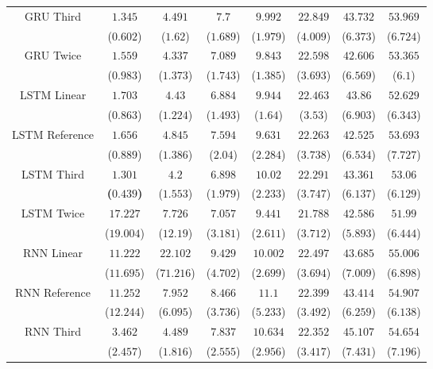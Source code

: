\begin{table}[!ht]
{\begin{tabular}{|c|c|c|c|c|c|c|c|}
			\multirow{2}{*}{GRU Third} & $1.345$ & $4.491$ & $7.7$ & $9.992$ & $22.849$ & $43.732$ & $53.969$ \\
			 & ($0.602$) & ($1.62$) & ($1.689$) & ($1.979$) & ($4.009$) & ($6.373$) & ($6.724$) \\ \hline
			\multirow{2}{*}{GRU Twice} & $1.559$ & $4.337$ & $7.089$ & $9.843$ & $22.598$ & $42.606$ & $53.365$ \\
			 & ($0.983$) & ($1.373$) & ($1.743$) & ($1.385$) & ($3.693$) & ($6.569$) & ($6.1$) \\ \hline
			\multirow{2}{*}{LSTM Linear} & $1.703$ & $4.43$ & $6.884$ & $9.944$ & $22.463$ & $43.86$ & $52.629$ \\
			 & ($0.863$) & ($1.224$) & ($1.493$) & ($1.64$) & ($3.53$) & ($6.903$) & ($6.343$) \\ \hline
			\multirow{2}{*}{LSTM Reference} & $1.656$ & $4.845$ & $7.594$ & $9.631$ & $22.263$ & $42.525$ & $53.693$ \\
			 & ($0.889$) & ($1.386$) & ($2.04$) & ($2.284$) & ($3.738$) & ($6.534$) & ($7.727$) \\ \hline
			\multirow{2}{*}{LSTM Third} & $\mathbf{1.301}$ & $4.2$ & $6.898$ & $10.02$ & $22.291$ & $43.361$ & $53.06$ \\
			 & \textbf{(}$\mathbf{0.439}$\textbf{)} & ($1.553$) & ($1.979$) & ($2.233$) & ($3.747$) & ($6.137$) & ($6.129$) \\ \hline
			\multirow{2}{*}{LSTM Twice} & $17.227$ & $7.726$ & $7.057$ & $9.441$ & $21.788$ & $42.586$ & $51.99$ \\
			 & ($19.004$) & ($12.19$) & ($3.181$) & ($2.611$) & ($3.712$) & ($5.893$) & ($6.444$) \\ \hline
			\multirow{2}{*}{RNN Linear} & $11.222$ & $22.102$ & $9.429$ & $10.002$ & $22.497$ & $43.685$ & $55.006$ \\
			 & ($11.695$) & ($71.216$) & ($4.702$) & ($2.699$) & ($3.694$) & ($7.009$) & ($6.898$) \\ \hline
			\multirow{2}{*}{RNN Reference} & $11.252$ & $7.952$ & $8.466$ & $11.1$ & $22.399$ & $43.414$ & $54.907$ \\
			 & ($12.244$) & ($6.095$) & ($3.736$) & ($5.233$) & ($3.492$) & ($6.259$) & ($6.138$) \\ \hline
			\multirow{2}{*}{RNN Third} & $3.462$ & $4.489$ & $7.837$ & $10.634$ & $22.352$ & $45.107$ & $54.654$ \\
			 & ($2.457$) & ($1.816$) & ($2.555$) & ($2.956$) & ($3.417$) & ($7.431$) & ($7.196$) \\ \hline

\end{tabular}}
\end{table}
